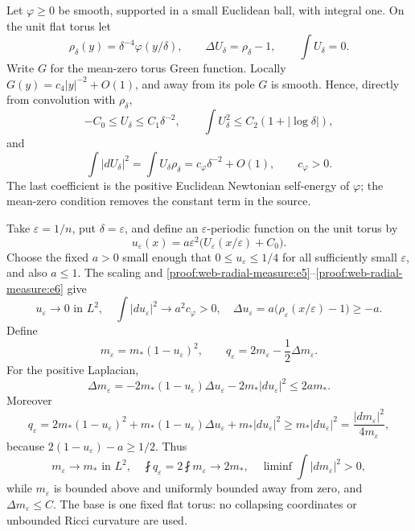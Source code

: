 Let \(\varphi\ge0\) be smooth, supported in a small Euclidean ball, with integral one. On the unit flat torus let \[
 \rho_\delta(y)=\delta^{-4}\varphi(y/\delta),\qquad
 \Delta U_\delta=\rho_\delta-1,\qquad\int U_\delta=0.
\] Write \(G\) for the mean-zero torus Green function. Locally \(G(y)=c_4|y|^{-2}+O(1)\), and away from its pole \(G\) is smooth. Hence, directly from convolution with \(\rho_\delta\), \[
 -C_0\le U_\delta\le C_1\delta^{-2},\qquad
 \int U_\delta^2\le C_2(1+|\log\delta|),
 \tag{\thesection.5}\label{proof:web-radial-measure:e5}
\] and \[
 \int|dU_\delta|^2=\int U_\delta\rho_\delta
 =c_\varphi\delta^{-2}+O(1),\qquad c_\varphi>0.
 \tag{\thesection.6}\label{proof:web-radial-measure:e6}
\] The last coefficient is the positive Euclidean Newtonian self-energy of \(\varphi\); the mean-zero condition removes the constant term in the source.

Take \(\varepsilon=1/n\), put \(\delta=\varepsilon\), and define an \(\varepsilon\)-periodic function on the unit torus by \[
 u_\varepsilon(x)=a\varepsilon^2\bigl(U_\varepsilon(x/\varepsilon)+C_0\bigr).
 \tag{\thesection.7}\label{proof:web-radial-measure:e7}
\] Choose the fixed \(a>0\) small enough that \(0\le u_\varepsilon\le1/4\) for all sufficiently small \(\varepsilon\), and also \(a\le1\). The scaling and \eqref{proof:web-radial-measure:e5}–\eqref{proof:web-radial-measure:e6} give \[
 u_\varepsilon\to0\text{ in }L^2,\quad
 \int|du_\varepsilon|^2\to a^2c_\varphi>0,\quad
 \Delta u_\varepsilon=a\bigl(\rho_\varepsilon(x/\varepsilon)-1\bigr)\ge-a.
 \tag{\thesection.8}\label{proof:web-radial-measure:e8}
\] Define \[
 m_\varepsilon=m_*(1-u_\varepsilon)^2,\qquad
 q_\varepsilon=2m_\varepsilon-\frac12\Delta m_\varepsilon.
 \tag{\thesection.9}\label{proof:web-radial-measure:e9}
\] For the positive Laplacian, \[
 \Delta m_\varepsilon
 =-2m_*(1-u_\varepsilon)\Delta u_\varepsilon
   -2m_*|du_\varepsilon|^2\le2am_*.
\] Moreover \[
 q_\varepsilon
 =2m_*(1-u_\varepsilon)^2
 +m_*(1-u_\varepsilon)\Delta u_\varepsilon
 +m_*|du_\varepsilon|^2
 \ge m_*|du_\varepsilon|^2
 =\frac{|dm_\varepsilon|^2}{4m_\varepsilon},
 \tag{\thesection.10}\label{proof:web-radial-measure:e10}
\] because \(2(1-u_\varepsilon)-a\ge1/2\). Thus \[
 m_\varepsilon\to m_*\text{ in }L^2,\quad
 \fint q_\varepsilon=2\fint m_\varepsilon\to2m_*,\quad
 \liminf\int|dm_\varepsilon|^2>0,
 \tag{\thesection.11}\label{proof:web-radial-measure:e11}
\] while \(m_\varepsilon\) is bounded above and uniformly bounded away from zero, and \(\Delta m_\varepsilon\le C\). The base is one fixed flat torus: no collapsing coordinates or unbounded Ricci curvature are used.

